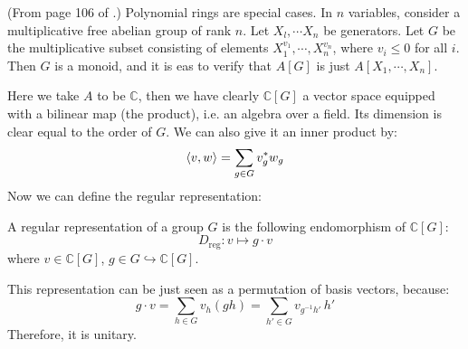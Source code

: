 \begin{ex}
    (From page 106 of \cite{lang-algebra}.)
    Polynomial rings are special cases. In $n$ variables, consider a
    multiplicative free abelian group of rank $n$. Let $X_l,\cdots
    X_n$ be generators. Let $G$ be the multiplicative subset
    consisting of elements $X_1^{v_1},\cdots,X_n^{v_n}$, where
    $v_i\leq 0$ for all $i$. Then $G$ is a monoid, and it is eas to
    verify that $A[G]$ is just $A[X_1,\cdots, X_n]$.
\end{ex}

Here we take $A$ to be $\mathbb{C}$, then we have clearly
$\mathbb{C}[G]$ a vector space equipped with a bilinear map (the
product), i.e. an algebra over a field. Its dimension is clear equal
to the order of $G$. We can also give it an inner product by:
\begin{equation}
    \braket{v,w} =\sum_{g\in G} v_g^* w_g
\end{equation}
Now we can define the regular representation:

\begin{defi}
    A regular representation of a group $G$ is the following
    endomorphism of $\mathbb{C}[G]$:
    \begin{equation}
        D_\text{reg}: v \mapsto g\cdot v
    \end{equation}
    where $v\in \mathbb{C}[G]$, $g\in G \hookrightarrow \mathbb{C}[G]$.
\end{defi}

\begin{remark}
    This representation can be just seen as a permutation of basis
    vectors, because:
    \begin{equation}
        g\cdot v = \sum_{h\in G} v_h (gh) = \sum_{h'\in G}
        v_{g^{-1}h'}\, h'
    \end{equation}
    Therefore, it is unitary.
\end{remark}

